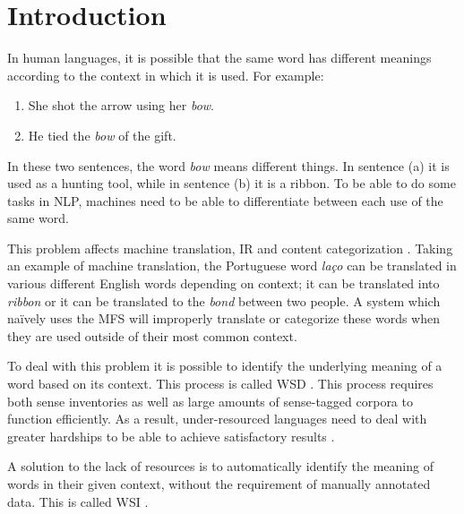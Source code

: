 \chapter{Introduction}


In human languages, it is possible that the same word has different meanings
according to the context in which it is used. For example:

\begin{enumerate}[label=(\alph*)]
 \item She shot the arrow using her \textit{bow}.
 \item He tied the \textit{bow} of the gift.
\end{enumerate}

In these two sentences, the word \textit{bow} means different things. In
sentence (a) it is used as a hunting tool, while in sentence (b) it is a ribbon.
To be able to do some tasks in \ac{NLP}, machines need to be able to
differentiate between each use of the same word.


This problem affects machine translation, \ac{IR} and content categorization
\cite{navigli2009word}. Taking an example of machine translation, the
Portuguese word \textit{laço} can be translated in various different English
words depending on context; it can be translated into \textit{ribbon} or it can
be translated to the \textit{bond} between two people. A system which naïvely
uses the \ac{MFS} will improperly translate or categorize these words when they
are used outside of their most common context.


To deal with this problem it is possible to identify the underlying meaning of a
word based on its context. This process is called \ac{WSD}
\cite{navigli2009word}. This process requires both sense inventories as well as
large amounts of sense-tagged corpora to function efficiently. As a result,
under-resourced languages need to deal with greater hardships to be able to
achieve satisfactory results \cite{ng1997getting}.

A solution to the lack of resources is to automatically identify the meaning of
words in their given context, without the requirement of manually annotated
data. This is called \ac{WSI} \cite{agirre2007semeval}.


